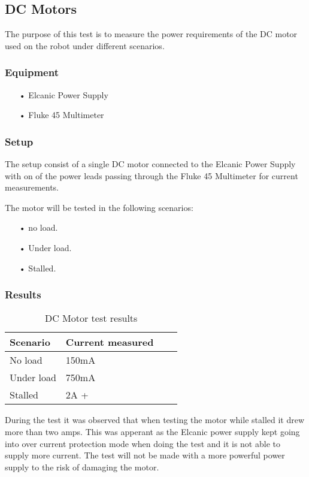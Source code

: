 \subsection{DC Motors}
The purpose of this test is to measure the power requirements of the DC motor used on the robot under different scenarios.
\subsubsection{Equipment}
\begin{enumerate}
	\item[•]Elcanic Power Supply
	\item[•]Fluke 45 Multimeter
\end{enumerate}

\subsubsection{Setup}
The setup consist of a single DC motor connected to the Elcanic Power Supply with on of the power leads passing through the Fluke 45 Multimeter for current measurements.

The motor will be tested in the following scenarios:
\begin{enumerate}
	\item[•]no load.
	\item[•]Under load.
	\item[•]Stalled.
\end{enumerate}

\subsubsection{Results}
\begin{table}[h]
\centering
\label{dcmotortest}
\begin{tabular}{|l|l|l|l|}
\hline
\textbf{Scenario} & \textbf{Current measured} \\ \hline
No load          & 150mA \\ \hline
Under load       & 750mA \\ \hline
Stalled         	 & 2A + \\ \hline
\end{tabular}
\caption{DC Motor test results}
\end{table}
During the test it was observed that when testing the motor while stalled it drew more than two amps. This was apperant as the Elcanic power supply kept going into over current protection mode when doing the test and it is not able to supply more current. The test will not be made with a more powerful power supply to the risk of damaging the motor.
